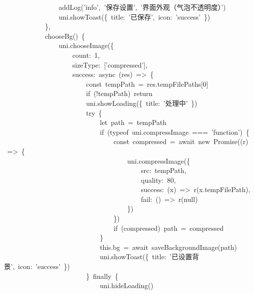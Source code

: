 \documentclass[a4paper,10pt]{article}
\begin{document}
{\ttfamily\footnotesize\raggedright
~~~~~~~~~~~~~~~~addLog('info',~'保存设置',~'界面外观（气泡不透明度）')\\
~~~~~~~~~~~~~~~~uni.showToast(\{~title:~'已保存',~icon:~'success'~\})\\
~~~~~~~~~~~~\},\\
~~~~~~~~~~~~chooseBg()~\{\\
~~~~~~~~~~~~~~~~uni.chooseImage(\{\\
~~~~~~~~~~~~~~~~~~~~count:~1,\\
~~~~~~~~~~~~~~~~~~~~sizeType:~['compressed'],\\
~~~~~~~~~~~~~~~~~~~~success:~async~(res)~=>~\{\\
~~~~~~~~~~~~~~~~~~~~~~~~const~tempPath~=~res.tempFilePaths[0]\\
~~~~~~~~~~~~~~~~~~~~~~~~if~(!tempPath)~return\\
~~~~~~~~~~~~~~~~~~~~~~~~uni.showLoading(\{~title:~'处理中'~\})\\
~~~~~~~~~~~~~~~~~~~~~~~~try~\{\\
~~~~~~~~~~~~~~~~~~~~~~~~~~~~let~path~=~tempPath\\
~~~~~~~~~~~~~~~~~~~~~~~~~~~~if~(typeof~uni.compressImage~===~'function')~\{\\
~~~~~~~~~~~~~~~~~~~~~~~~~~~~~~~~const~compressed~=~await~new~Promise((r)~=>~\{\\
~~~~~~~~~~~~~~~~~~~~~~~~~~~~~~~~~~~~uni.compressImage(\{\\
~~~~~~~~~~~~~~~~~~~~~~~~~~~~~~~~~~~~~~~~src:~tempPath,\\
~~~~~~~~~~~~~~~~~~~~~~~~~~~~~~~~~~~~~~~~quality:~80,\\
~~~~~~~~~~~~~~~~~~~~~~~~~~~~~~~~~~~~~~~~success:~(x)~=>~r(x.tempFilePath),\\
~~~~~~~~~~~~~~~~~~~~~~~~~~~~~~~~~~~~~~~~fail:~()~=>~r(null)\\
~~~~~~~~~~~~~~~~~~~~~~~~~~~~~~~~~~~~\})\\
~~~~~~~~~~~~~~~~~~~~~~~~~~~~~~~~\})\\
~~~~~~~~~~~~~~~~~~~~~~~~~~~~~~~~if~(compressed)~path~=~compressed\\
~~~~~~~~~~~~~~~~~~~~~~~~~~~~\}\\
~~~~~~~~~~~~~~~~~~~~~~~~~~~~this.bg~=~await~saveBackgroundImage(path)\\
~~~~~~~~~~~~~~~~~~~~~~~~~~~~uni.showToast(\{~title:~'已设置背景',~icon:~'success'~\})\\
~~~~~~~~~~~~~~~~~~~~~~~~\}~finally~\{\\
~~~~~~~~~~~~~~~~~~~~~~~~~~~~uni.hideLoading()\\
}
\end{document}
